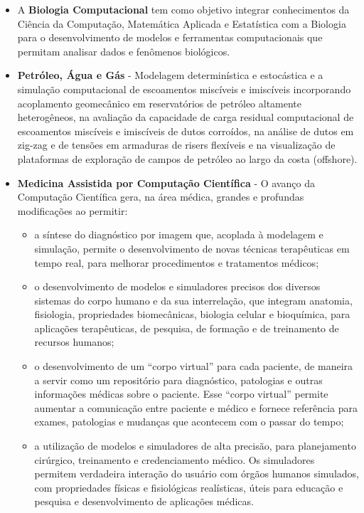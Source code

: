 \begin{itemize}
		\item A \textbf{Biologia Computacional} tem como objetivo integrar
			conhecimentos da Ciência da Computação, Matemática Aplicada e
			Estatística com a Biologia para o desenvolvimento de modelos e
			ferramentas computacionais que permitam analisar dados e fenômenos
			biológicos. 

		\item \textbf{Petróleo, Água e Gás} - Modelagem determinística e
			estocástica e a simulação computacional de escoamentos miscíveis e
			imiscíveis incorporando acoplamento geomecânico em reservatórios de
			petróleo altamente heterogêneos, na avaliação da capacidade de carga
			residual computacional de escoamentos miscíveis e imiscíveis de
			dutos corroídos, na análise de dutos em zig-zag e de tensões em
			armaduras de risers flexíveis e na visualização de plataformas de
			exploração de campos de petróleo ao largo da costa (offshore).

		\item \textbf{Medicina Assistida por Computação Científica} - O avanço
			da Computação Científica gera, na área médica, grandes e profundas
			modificações ao permitir:
			\begin{itemize}

				\item a síntese do diagnóstico por imagem que, acoplada à
					modelagem e simulação, permite o desenvolvimento de novas
					técnicas terapêuticas em tempo real, para melhorar
					procedimentos e tratamentos médicos;

				\item o desenvolvimento de modelos e simuladores precisos dos
					diversos sistemas do corpo humano e da sua interrelação, que
					integram anatomia, fisiologia, propriedades biomecânicas,
					biologia celular e bioquímica, para aplicações terapêuticas,
					de pesquisa, de formação e de treinamento de recursos
					humanos;

				\item o desenvolvimento de um “corpo virtual” para cada
					paciente, de maneira a servir como um repositório para
					diagnóstico, patologias e outras informações médicas sobre o
					paciente.  Esse “corpo virtual” permite aumentar a
					comunicação entre paciente e médico e fornece referência
					para exames, patologias e mudanças que acontecem com o
					passar do tempo;

				\item a utilização de modelos e simuladores de alta precisão,
					para planejamento cirúrgico, treinamento e credenciamento
					médico. Os simuladores permitem verdadeira interação do
					usuário com órgãos humanos simulados, com propriedades
					físicas e fisiológicas realísticas, úteis para educação e
					pesquisa e desenvolvimento de aplicações médicas.

			\end{itemize}

	\end{itemize}
